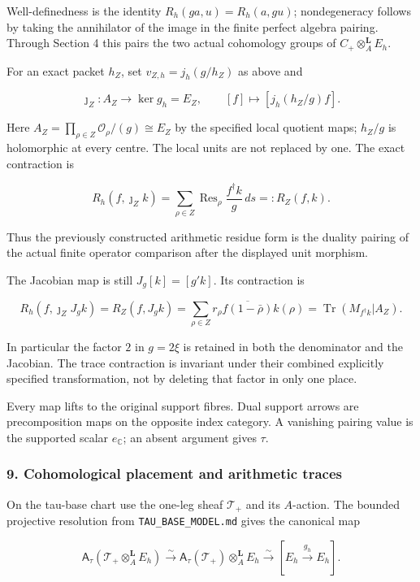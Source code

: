 Well-definedness is the identity \(R_h(ga,u)=R_h(a,gu)\); nondegeneracy follows by taking the
annihilator of the image in the finite perfect algebra pairing. Through Section 4 this pairs the two
actual cohomology groups of \(C_+\otimes_A^{\mathbf L}E_h\).

For an exact packet \(h_Z\), set \(v_{Z,h}=j_h(g/h_Z)\) as above and

\[\jmath_Z:A_Z\to\ker g_h=E_Z,\qquad
[f]\mapsto[j_h(h_Z/g)f].\]

Here \(A_Z=\prod_{\rho\in Z}\mathcal O_\rho/(g)\cong E_Z\) by the specified local quotient maps;
\(h_Z/g\) is holomorphic at every centre. The local units are not replaced by one. The exact
contraction is

\[\boxed{R_h(f,\jmath_Zk)=
\sum_{\rho\in Z}\operatorname{Res}_{\rho}\frac{f^\dagger k}{g}\,ds=:R_Z(f,k).}\]

Thus the previously constructed arithmetic residue form is the duality pairing of the actual finite
operator comparison after the displayed unit morphism.

The Jacobian map is still \(J_g[k]=[g'k]\). Its contraction is

\[\boxed{R_h(f,\jmath_ZJ_gk)=R_Z(f,J_gk)
=\sum_{\rho\in Z}r_\rho\overline{f(1-\bar\rho)}k(\rho)
=\operatorname{Tr}(M_{f^\dagger k}|A_Z).}\]

In particular the factor \(2\) in \(g=2\xi\) is retained in both the denominator and the Jacobian.
The trace contraction is invariant under their combined explicitly specified transformation, not by
deleting that factor in only one place.

Every map lifts to the original support fibres. Dual support arrows are precomposition maps on the
opposite index category. A vanishing pairing value is the supported scalar \(e_{\mathbb C}\); an
absent argument gives \(\tau\).

\subsubsection{9. Cohomological placement and arithmetic
traces}\label{pr_8:cohomological-placement-and-arithmetic-traces}

On the tau-base chart use the one-leg sheaf \(\mathcal T_+\) and its \(A\)-action. The bounded
projective resolution from \nolinkurl{TAU_BASE_MODEL.md} gives the canonical map

\[\mathsf A_\tau(\mathcal T_+\otimes_A^{\mathbf L}E_h)
\xrightarrow{\sim}
\mathsf A_\tau(\mathcal T_+)\otimes_A^{\mathbf L}E_h
\xrightarrow{\sim}[E_h\xrightarrow{g_h}E_h].\]

